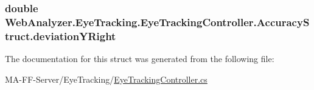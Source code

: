 \subsubsection[{deviation\+Y\+Right}]{\setlength{\rightskip}{0pt plus 5cm}double Web\+Analyzer.\+Eye\+Tracking.\+Eye\+Tracking\+Controller.\+Accuracy\+Struct.\+deviation\+Y\+Right}\label{struct_web_analyzer_1_1_eye_tracking_1_1_eye_tracking_controller_1_1_accuracy_struct_a1f188a004ecaf067028b9695647d0c7e}


The documentation for this struct was generated from the following file\+:\begin{DoxyCompactItemize}
\item 
M\+A-\/\+F\+F-\/\+Server/\+Eye\+Tracking/\hyperlink{_eye_tracking_controller_8cs}{Eye\+Tracking\+Controller.\+cs}\end{DoxyCompactItemize}
